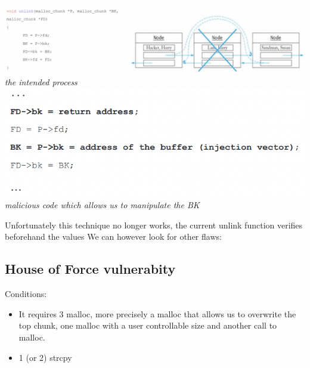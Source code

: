 \documentclass[11pt, oneside]{article}   	%
\begin{document}
\begin{center}
\includegraphics[scale = 0.6]{atk1}
\emph{the intended process}\\
\includegraphics[scale = 0.6]{atk2}\\
\emph{malicious code which allows us to manipulate the BK}
\end{center}
Unfortunately this technique no longer works, the current unlink function verifies beforehand the values
We can however look for other flaws:

\subsection*{House of Force vulnerabity}
Conditions:
\begin{itemize}
\item It requires 3 malloc, more precisely a malloc that allows us to overwrite the top chunk, one malloc with a user controllable size and another call to malloc.
\item 1 (or 2) strcpy
\end{itemize}
\end{document}
